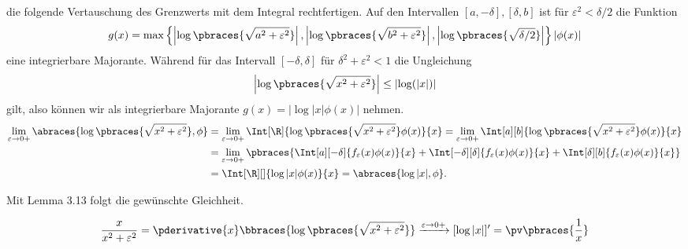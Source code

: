 \begin{solution}
die folgende Vertauschung des Grenzwerts mit dem Integral rechtfertigen.
Auf den Intervallen $[a,-\delta], [\delta, b]$ ist für $\varepsilon^2 < \delta/2$
die Funktion
\begin{align*}
  g(x) = \max\left\{\left|\log\pbraces{\sqrt{a^2 + \varepsilon^2}}\right|, \left|\log\pbraces{\sqrt{b^2 + \varepsilon^2}}\right|, \left|\log\pbraces{\sqrt{\delta/2}}\right|\right\}|\phi(x)|
\end{align*} eine
integrierbare Majorante.
Während für das Intervall $[-\delta,\delta]$ für $ \delta^2 + \varepsilon^2 < 1$ die Ungleichung
\begin{align*}
  \left|\log\pbraces{\sqrt{x^2 + \varepsilon^2}}\right| \leq \left|\log(|x|)\right|
\end{align*}
gilt, also können wir als integrierbare Majorante $g(x) = |\log{|x|}\phi(x)|$ nehmen.
\begin{align*}
    \lim_{\varepsilon \to 0+}
    \abraces{\log \pbraces{\sqrt{x^2 + \varepsilon^2}}, \phi}
    & =
    \lim_{\varepsilon \to 0+}
    \Int[\R]{\log\pbraces{\sqrt{x^2 + \varepsilon^2}} \phi(x)}{x}
    =
    \lim_{\varepsilon \to 0+}
    \Int[a][b]{\log\pbraces{\sqrt{x^2 + \varepsilon^2}} \phi(x)}{x} \\
    & =
    \lim_{\varepsilon \to 0+}
    \pbraces
    {
        \Int[a][-\delta]{f_\varepsilon(x)\phi(x)}{x}
        +
        \Int[-\delta][\delta]{f_\varepsilon(x)\phi(x)}{x}
        +
        \Int[\delta][b]{f_\varepsilon(x) \phi(x)}{x}
    } \\
    & =
    \Int[\R][]{\log|x| \phi(x)}{x}
    =
    \abraces{\log|x|, \phi}.
\end{align*}

Mit Lemma 3.13 folgt die gewünschte Gleichheit.

\begin{align*}
    \frac{x}{x^2 + \varepsilon^2}
    =
    \pderivative{x}
    \bbraces
    {
        \log
        \pbraces
        {
            \sqrt{x^2 + \varepsilon^2}
        }
    }
    \xrightarrow{\varepsilon \to 0+}
    [\log{|x|}]^\prime
    =
    \pv \pbraces{\frac{1}{x}}
\end{align*}

\end{solution}

